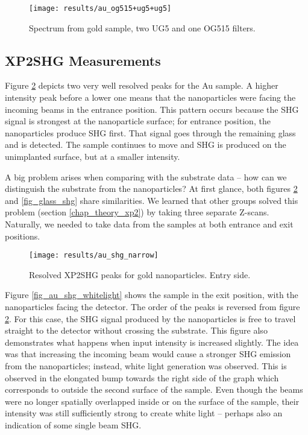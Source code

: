\begin{figure}[H]
\centering
\texttt{[image: results/au\_og515+ug5+ug5]}
\caption[Spectrum from gold sample, with more filters.]{Spectrum from gold sample, two UG5 and one OG515 filters.\label{fig_filter_all}}
\end{figure}

\subsection{XP2SHG Measurements}
Figure \ref{fig_au_shg_narrow} depicts two very well resolved peaks for the Au sample. A higher intensity peak before a lower one means that the nanoparticles were facing the incoming beams in the entrance position. This pattern occurs because the SHG signal is strongest at the nanoparticle surface; for entrance position, the nanoparticles produce SHG first. That signal goes through the remaining glass and is detected. The sample continues to move and SHG is produced on the unimplanted surface, but at a smaller intensity.

A big problem arises when comparing with the substrate data -- how can we distinguish the substrate from the nanoparticles? At first glance, both figures \ref{fig_au_shg_narrow} and \ref{fig_glass_shg} share similarities. We learned that other groups solved this problem (section \ref{chap_theory_xp2}) by taking three separate Z-scans. Naturally, we needed to take data from the samples at both entrance and exit positions.

\begin{figure}[h]
\centering
\texttt{[image: results/au\_shg\_narrow]}
\caption[Resolved XP2SHG peaks.]{Resolved XP2SHG peaks for gold nanoparticles. Entry side.\label{fig_au_shg_narrow}}
\end{figure}

Figure \ref{fig_au_shg_whitelight} shows the sample in the exit position, with the nanoparticles facing the detector. The order of the peaks is reversed from figure \ref{fig_au_shg_narrow}. For this case, the SHG signal produced by the nanoparticles is free to travel straight to the detector without crossing the substrate. This figure also demonstrates what happens when input intensity is increased slightly. The idea was that increasing the incoming beam would cause a stronger SHG emission from the nanoparticles; instead, white light generation was observed. This is observed in the elongated bump towards the right side of the graph which corresponds to outside the second surface of the sample. Even though the beams were no longer spatially overlapped inside or on the surface of the sample, their intensity was still sufficiently strong to create white light -- perhaps also an indication of some single beam SHG.

